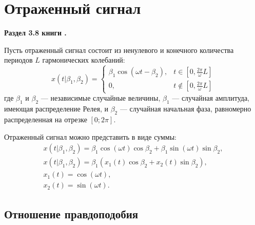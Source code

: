 \documentclass[a4paper,12pt]{article}
\begin{document}
    \section{Отраженный сигнал}

    \textbf{Раздел 3.8 книги \cite{SCHIRMAN}.}

    Пусть отраженный сигнал состоит из ненулевого и конечного количества периодов $L$ гармонических колебаний:
    \[
        x(t | \beta_1, \beta_2)
        =
        \left \{
        \begin{array}{ll}
            \beta_1 \cos ( \omega t - \beta_2 ) , & t \in \left [ 0, \frac{2 \pi}{\omega} L \right ]    \\
            0,                                    & t \notin \left [ 0, \frac{2 \pi}{\omega} L \right ]
        \end{array}
        \right .
    \]
    где $\beta_1$ и $\beta_2$ --- независимые случайные величины, $\beta_1$ --- случайная амплитуда, имеющая распределение Релея, и $\beta_2$ --- случайная начальная фаза,
    равномерно распределенная на отрезке $[0; 2 \pi]$.

    Отраженный сигнал можно представить в виде суммы:
    \begin{gather*}
        x(t | \beta_1, \beta_2 ) = \beta_1 \cos ( \omega t ) \cos \beta_2 + \beta_1 \sin ( \omega t ) \sin \beta_2 , \\
        x(t | \beta_1, \beta_2 ) = \beta_1 \left ( x_1(t) \cos \beta_2 + x_2(t) \sin \beta_2 \right ), \\
        x_1(t) = \cos ( \omega t ) , \\
        x_2(t) = \sin ( \omega t ) .
    \end{gather*}

    \subsection{Отношение правдоподобия}
\end{document}
